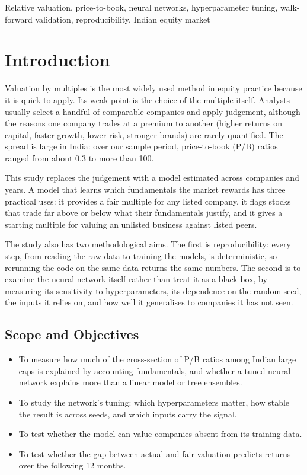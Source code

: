 \documentclass[conference]{IEEEtran}
\begin{document}
\begin{IEEEkeywords}
Relative valuation, price-to-book, neural networks, hyperparameter tuning, walk-forward validation, reproducibility, Indian equity market
\end{IEEEkeywords}

\section{Introduction}
Valuation by multiples is the most widely used method in equity practice because it is quick to apply. Its weak point is the choice of the multiple itself. Analysts usually select a handful of comparable companies and apply judgement, although the reasons one company trades at a premium to another (higher returns on capital, faster growth, lower risk, stronger brands) are rarely quantified. The spread is large in India: over our sample period, price-to-book (P/B) ratios ranged from about 0.3 to more than 100.

This study replaces the judgement with a model estimated across companies and years. A model that learns which fundamentals the market rewards has three practical uses: it provides a fair multiple for any listed company, it flags stocks that trade far above or below what their fundamentals justify, and it gives a starting multiple for valuing an unlisted business against listed peers.

The study also has two methodological aims. The first is reproducibility: every step, from reading the raw data to training the models, is deterministic, so rerunning the code on the same data returns the same numbers. The second is to examine the neural network itself rather than treat it as a black box, by measuring its sensitivity to hyperparameters, its dependence on the random seed, the inputs it relies on, and how well it generalises to companies it has not seen.

\subsection{Scope and Objectives}
\begin{itemize}
\item To measure how much of the cross-section of P/B ratios among Indian large caps is explained by accounting fundamentals, and whether a tuned neural network explains more than a linear model or tree ensembles.
\item To study the network's tuning: which hyperparameters matter, how stable the result is across seeds, and which inputs carry the signal.
\item To test whether the model can value companies absent from its training data.
\item To test whether the gap between actual and fair valuation predicts returns over the following 12 months.
\end{itemize}
\end{document}
